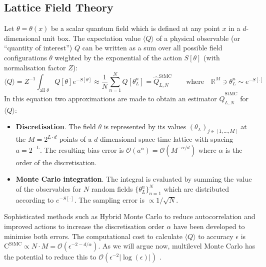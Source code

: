 \documentclass[11pt]{article}
\begin{document}
\subsection{Lattice Field Theory}
Let $\theta=\theta(x)$ be a scalar quantum field which is defined at any point $x$ in a $d$-dimensional unit box. The expectation value $\langle Q\rangle$ of a physical observable (or ``quantity of interest'') $Q$ can be written as a sum over all possible field configurations $\theta$ weighted by the exponential of the action $S[\theta]$ (with normalisation factor $Z$):
\begin{equation}
  \langle Q\rangle = Z^{-1} \int_{\text{all $\theta$}} Q[\theta]e^{-S[\theta]} \approx \frac{1}{N} \sum_{n=1}^N Q[\theta_L^n] = \hat{Q}^{\text{StMC}}_{L,N} \qquad\text{where}\quad \mathbb{R}^{M}\ni \theta_L^n\sim e^{-S[\cdot]}\label{eqn:StMCestimator}
\end{equation}
In this equation two approximations are made to obtain an estimator $\hat{Q}^{\text{StMC}}_{L,N}$ for $\langle Q\rangle$:
\begin{itemize}
\item \textbf{Discretisation}. The field $\theta$ is represented by its values $(\theta_L)_{j\in [1,\dots,M]}$ at the $M=2^{L\cdot d}$ points of a $d$-dimensional space-time lattice with spacing $a=2^{-L}$. The resulting bias error is $\mathcal{O}(a^\alpha)=\mathcal{O}(M^{-\alpha/d})$ where $\alpha$ is the order of the discretisation.
    \item \textbf{Monte Carlo integration}. The integral is evaluated by summing the value of the observables for $N$ random fields $\{\theta_L^n\}_{n=1}^N$ which are distributed according to $e^{-S[\cdot ]}$. The sampling error is $\propto{1/\sqrt{N}}$.
\end{itemize}
Sophisticated methods such as Hybrid Monte Carlo to reduce autocorrelation \cite{Duane1987} and improved actions to increase the discretisation order $\alpha$ \cite{Lepage1994} have been developed to minimise both errors.
The computational cost to calculate $\langle Q\rangle$ to accuracy $\epsilon$ is $\text{C}^{\text{StMC}}\propto N\cdot M=\mathcal{O}(\epsilon^{-2-d/\alpha})$. As we will argue now, multilevel Monte Carlo has the potential to reduce this to $\mathcal{O}(\epsilon^{-2}|\log(\epsilon)|)$ \cite{Dodwell2015}.
\end{document}
